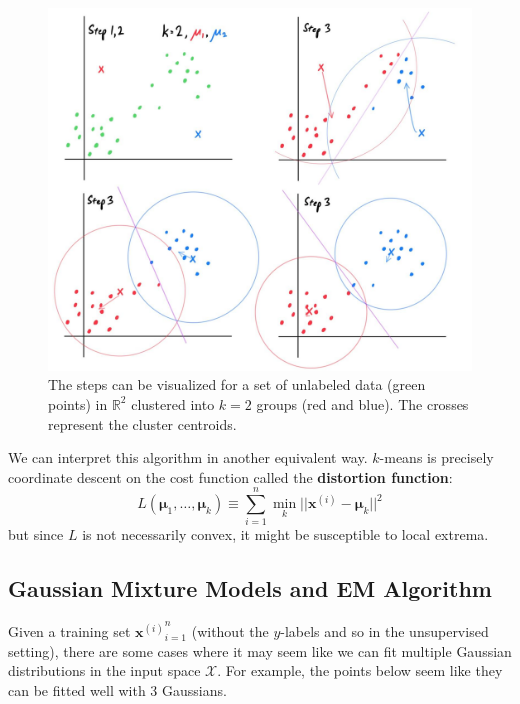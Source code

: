 \documentclass{article}
\begin{document}
    \begin{figure}[H]
      \centering 
      \includegraphics[scale=0.25]{img/k_means_clustering.jpg}
      \caption{The steps can be visualized for a set of unlabeled data (green points) in $\mathbb{R}^2$ clustered into $k=2$ groups (red and blue). The crosses represent the cluster centroids.} 
      \label{fig:k_means_clustering}
    \end{figure}

    We can interpret this algorithm in another equivalent way. $k$-means is precisely coordinate descent on the cost function called the \textbf{distortion function}: 
    \begin{equation}
      L(\boldsymbol{\mu}_1, \ldots, \boldsymbol{\mu}_k) \equiv \sum_{i=1}^n \min_k ||\mathbf{x}^{(i)} - \boldsymbol{\mu}_k ||^2
    \end{equation}
    but since $L$ is not necessarily convex, it might be susceptible to local extrema.

  \subsection{Gaussian Mixture Models and EM Algorithm}

      Given a training set ${\mathbf{x}^{(i)}}_{i=1}^n$ (without the $y$-labels and so in the unsupervised setting), there are some cases where it may seem like we can fit multiple Gaussian distributions in the input space $\mathcal{X}$. For example, the points below seem like they can be fitted well with 3 Gaussians.
\end{document}
